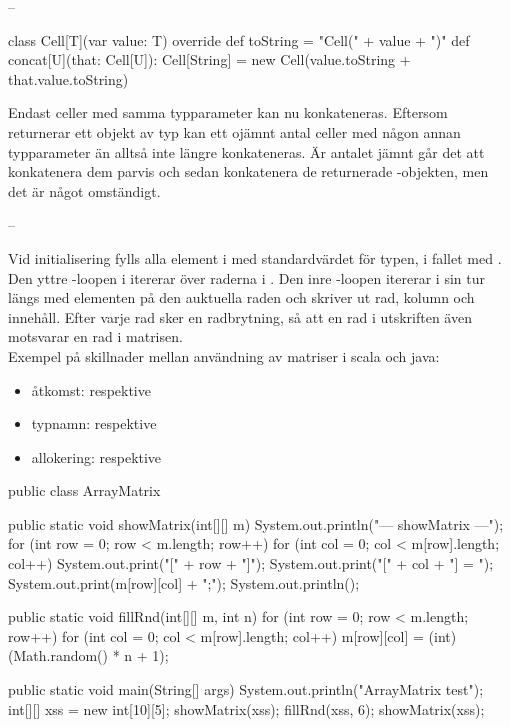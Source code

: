 \Task     %

\Subtask --

\Subtask \begin{Code}
class Cell[T](var value: T){
	override def toString = "Cell(" + value + ")"
	def concat[U](that: Cell[U]): Cell[String] =
		new Cell(value.toString + that.value.toString)
}
\end{Code}

\Subtask  Endast celler med samma typparameter kan nu konkateneras. Eftersom  returnerar ett objekt av typ  kan ett ojämnt antal celler med någon annan typparameter än  alltså inte längre konkateneras. Är antalet jämnt går det att konkatenera dem parvis och sedan konkatenera de returnerade -objekten, men det är något omständigt.

\Subtask  --


\Task     %

\Subtask Vid initialisering fylls alla element i  med standardvärdet för typen,  i fallet med . Den yttre -loopen i  itererar över raderna i . Den inre -loopen itererar i sin tur längs med elementen på den auktuella raden och skriver ut rad, kolumn och innehåll. Efter varje rad sker en radbrytning, så att en rad i utskriften även motsvarar en rad i matrisen.\\
Exempel på skillnader mellan användning av matriser i scala och java:
\begin{itemize}
\item åtkomst:  respektive 
\item typnamn:  respektive  
\item allokering:  respektive 
\end{itemize}

\Subtask \begin{Code}
public class ArrayMatrix {

	public static void showMatrix(int[][] m){
		System.out.println("\n--- showMatrix ---");
		for (int row = 0; row < m.length; row++){
			for (int col = 0; col < m[row].length; col++) {
				System.out.print("[" + row + "]");
				System.out.print("[" + col + "] = ");
				System.out.print(m[row][col] + ";");
			} System.out.println();
		}
	}

	public static void fillRnd(int[][] m, int n){
		for (int row = 0; row < m.length; row++){
			for (int col = 0; col < m[row].length; col++) {
				m[row][col] = (int) (Math.random() * n + 1);
			}
		}
	}

	public static void main(String[] args) {
		System.out.println("ArrayMatrix test");
		int[][] xss = new int[10][5];
		showMatrix(xss);
		fillRnd(xss, 6);
		showMatrix(xss);
	}
}
\end{Code}


